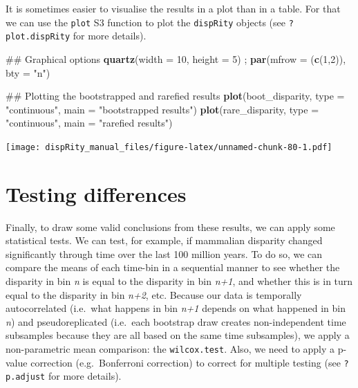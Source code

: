 \documentclass[]{book}
\newenvironment{Shaded}{\begin{snugshade}}{\end{snugshade}}
\newcommand{\KeywordTok}[1]{\textcolor[rgb]{0.13,0.29,0.53}{\textbf{#1}}}
\newcommand{\DataTypeTok}[1]{\textcolor[rgb]{0.13,0.29,0.53}{#1}}
\newcommand{\DecValTok}[1]{\textcolor[rgb]{0.00,0.00,0.81}{#1}}
\newcommand{\StringTok}[1]{\textcolor[rgb]{0.31,0.60,0.02}{#1}}
\newcommand{\NormalTok}[1]{#1}
\theoremstyle{definition}
\theoremstyle{definition}
\theoremstyle{remark}
\begin{document}
It is sometimes easier to visualise the results in a plot than in a
table. For that we can use the \texttt{plot} S3 function to plot the
\texttt{dispRity} objects (see \texttt{?plot.dispRity} for more
details).

\begin{Shaded}
\begin{Highlighting}[]
\NormalTok{## Graphical options}
\KeywordTok{quartz}\NormalTok{(}\DataTypeTok{width =} \DecValTok{10}\NormalTok{, }\DataTypeTok{height =} \DecValTok{5}\NormalTok{) ; }\KeywordTok{par}\NormalTok{(}\DataTypeTok{mfrow =}\NormalTok{ (}\KeywordTok{c}\NormalTok{(}\DecValTok{1}\NormalTok{,}\DecValTok{2}\NormalTok{)), }\DataTypeTok{bty =} \StringTok{"n"}\NormalTok{)}

\NormalTok{## Plotting the bootstrapped and rarefied results}
\KeywordTok{plot}\NormalTok{(boot_disparity, }\DataTypeTok{type =} \StringTok{"continuous"}\NormalTok{, }\DataTypeTok{main =} \StringTok{"bootstrapped results"}\NormalTok{)}
\KeywordTok{plot}\NormalTok{(rare_disparity, }\DataTypeTok{type =} \StringTok{"continuous"}\NormalTok{, }\DataTypeTok{main =} \StringTok{"rarefied results"}\NormalTok{)}
\end{Highlighting}
\end{Shaded}

\texttt{[image: dispRity\_manual\_files/figure-latex/unnamed-chunk-80-1.pdf]}

\section{Testing differences}\label{testing-differences}

Finally, to draw some valid conclusions from these results, we can apply
some statistical tests. We can test, for example, if mammalian disparity
changed significantly through time over the last 100 million years. To
do so, we can compare the means of each time-bin in a sequential manner
to see whether the disparity in bin \emph{n} is equal to the disparity
in bin \emph{n+1}, and whether this is in turn equal to the disparity in
bin \emph{n+2}, etc. Because our data is temporally autocorrelated
(i.e.~what happens in bin \emph{n+1} depends on what happened in bin
\emph{n}) and pseudoreplicated (i.e.~each bootstrap draw creates
non-independent time subsamples because they are all based on the same
time subsamples), we apply a non-parametric mean comparison: the
\texttt{wilcox.test}. Also, we need to apply a p-value correction
(e.g.~Bonferroni correction) to correct for multiple testing (see
\texttt{?p.adjust} for more details).
\end{document}
